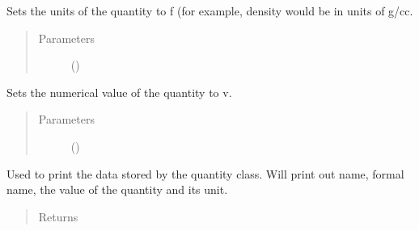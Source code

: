 \documentclass[letterpaper,10pt,openany,oneside,english]{sphinxmanual}
\begin{document}
\begin{fulllineitems}
\begin{fulllineitems}
\begin{quote}
\begin{description}
\end{description}\end{quote}

\end{fulllineitems}


\begin{fulllineitems}
\label{\detokenize{support_rst/quantity:quantity.Quantity.SetUnit}}
Sets the units of the quantity to f (for example, density would be in
units of g/cc.
\begin{quote}\begin{description}
\item[{Parameters}] \leavevmode
{} () \textendash{} 

\end{description}\end{quote}

\end{fulllineitems}


\begin{fulllineitems}
\label{\detokenize{support_rst/quantity:quantity.Quantity.SetValue}}
Sets the numerical value of the quantity to v.
\begin{quote}\begin{description}
\item[{Parameters}] \leavevmode
{} () \textendash{} 

\end{description}\end{quote}

\end{fulllineitems}


\begin{fulllineitems}
\label{\detokenize{support_rst/quantity:quantity.Quantity.__repr__}}
Used to print the data stored by the quantity class. Will print out
name, formal name, the value of the quantity and its unit.
\begin{quote}\begin{description}
\item[{Returns}] \leavevmode
{}


\end{description}
\end{quote}
\end{fulllineitems}
\end{fulllineitems}
\end{document}
